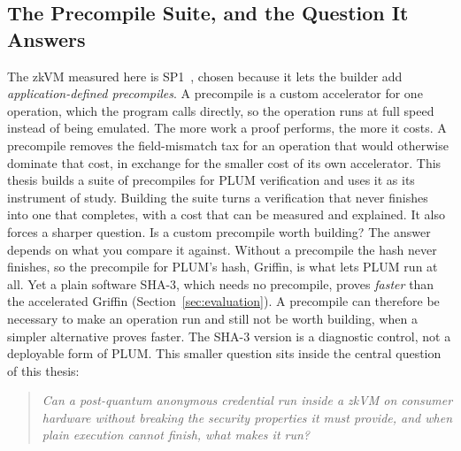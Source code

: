 \subsection{The Precompile Suite, and the Question It Answers}\label{ssec:question}
The zkVM measured here is SP1~\cite{succinct2024sp1}, chosen because it lets the builder add \emph{application-defined precompiles}. A precompile is a custom accelerator for one operation, which the program calls directly, so the operation runs at full speed instead of being emulated. The more work a proof performs, the more it costs. A precompile removes the field-mismatch tax for an operation that would otherwise dominate that cost, in exchange for the smaller cost of its own accelerator. This thesis builds a suite of precompiles for PLUM verification and uses it as its instrument of study. Building the suite turns a verification that never finishes into one that completes, with a cost that can be measured and explained. It also forces a sharper question. Is a custom precompile worth building? The answer depends on what you compare it against. Without a precompile the hash never finishes, so the precompile for PLUM's hash, Griffin, is what lets PLUM run at all. Yet a plain software SHA-3, which needs no precompile, proves \emph{faster} than the accelerated Griffin (Section~\ref{sec:evaluation}). A precompile can therefore be necessary to make an operation run and still not be worth building, when a simpler alternative proves faster. The SHA-3 version is a diagnostic control, not a deployable form of PLUM. This smaller question sits inside the central question of this thesis:

\begin{quote}
\emph{Can a post-quantum anonymous credential run inside a zkVM on consumer hardware without breaking the security properties it must provide, and when plain execution cannot finish, what makes it run?}
\end{quote}

